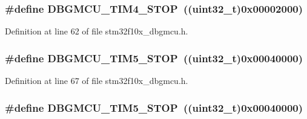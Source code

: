 \subsubsection[{\texorpdfstring{D\+B\+G\+M\+C\+U\+\_\+\+T\+I\+M4\+\_\+\+S\+T\+OP}{DBGMCU_TIM4_STOP}}]{\setlength{\rightskip}{0pt plus 5cm}\#define D\+B\+G\+M\+C\+U\+\_\+\+T\+I\+M4\+\_\+\+S\+T\+OP~(({\bf uint32\+\_\+t})0x00002000)}\hypertarget{group___d_b_g_m_c_u___exported___constants_gac87363a4018e2b23a907cfaf836494f1}{}\label{group___d_b_g_m_c_u___exported___constants_gac87363a4018e2b23a907cfaf836494f1}


Definition at line 62 of file stm32f10x\+\_\+dbgmcu.\+h.

\subsubsection[{\texorpdfstring{D\+B\+G\+M\+C\+U\+\_\+\+T\+I\+M5\+\_\+\+S\+T\+OP}{DBGMCU_TIM5_STOP}}]{\setlength{\rightskip}{0pt plus 5cm}\#define D\+B\+G\+M\+C\+U\+\_\+\+T\+I\+M5\+\_\+\+S\+T\+OP~(({\bf uint32\+\_\+t})0x00040000)}\hypertarget{group___d_b_g_m_c_u___exported___constants_gaf97e21534b3aa9482af496497a37ff4b}{}\label{group___d_b_g_m_c_u___exported___constants_gaf97e21534b3aa9482af496497a37ff4b}


Definition at line 67 of file stm32f10x\+\_\+dbgmcu.\+h.

\subsubsection[{\texorpdfstring{D\+B\+G\+M\+C\+U\+\_\+\+T\+I\+M5\+\_\+\+S\+T\+OP}{DBGMCU_TIM5_STOP}}]{\setlength{\rightskip}{0pt plus 5cm}\#define D\+B\+G\+M\+C\+U\+\_\+\+T\+I\+M5\+\_\+\+S\+T\+OP~(({\bf uint32\+\_\+t})0x00040000)}\hypertarget{group___d_b_g_m_c_u___exported___constants_gaf97e21534b3aa9482af496497a37ff4b}{}\label{group___d_b_g_m_c_u___exported___constants_gaf97e21534b3aa9482af496497a37ff4b}


